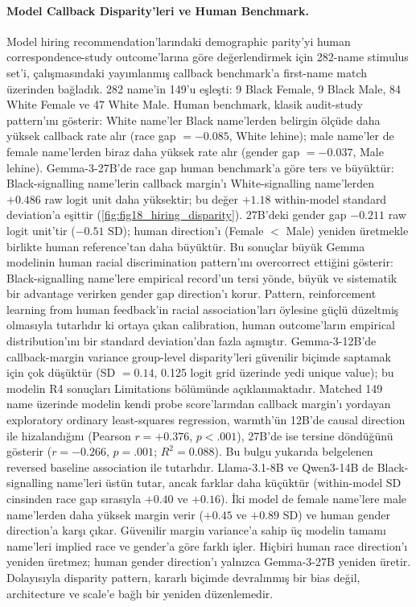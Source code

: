 \documentclass[twocolumn]{article}
\begin{document}
\paragraph{Model Callback Disparity'leri ve Human Benchmark.}
Model hiring recommendation'larındaki demographic parity'yi human
correspondence-study outcome'larına göre değerlendirmek için 282-name stimulus
set'i, \citet{gallo2024warmth} çalışmasındaki yayımlanmış callback benchmark'a
first-name match üzerinden bağladık. 282 name'in 149'u eşleşti: 9 Black Female,
9 Black Male, 84 White Female ve 47 White Male. Human benchmark, klasik
audit-study pattern'ını gösterir: White name'ler Black name'lerden belirgin
ölçüde daha yüksek callback rate alır (race gap $= -0.085$, White lehine);
male name'ler de female name'lerden biraz daha yüksek rate alır (gender gap
$= -0.037$, Male lehine). Gemma-3-27B'de race gap human benchmark'a göre ters
ve büyüktür: Black-signalling name'lerin callback margin'ı White-signalling
name'lerden $+0.486$ raw logit unit daha yüksektir; bu değer $+1.18$ within-model
standard deviation'a eşittir (\autoref{fig:fig18_hiring_disparity}). 27B'deki
gender gap $-0.211$ raw logit unit'tir ($-0.51$ SD); human direction'ı
(Female $<$ Male) yeniden üretmekle birlikte human reference'tan daha büyüktür.
Bu sonuçlar büyük Gemma modelinin human racial discrimination pattern'ını
overcorrect ettiğini gösterir: Black-signalling name'lere empirical record'un
tersi yönde, büyük ve sistematik bir advantage verirken gender gap direction'ı
korur. Pattern, reinforcement learning from human feedback'in racial
association'ları öylesine güçlü düzeltmiş olmasıyla tutarlıdır ki ortaya çıkan
calibration, human outcome'ların empirical distribution'ını bir standard
deviation'dan fazla aşmıştır. Gemma-3-12B'de callback-margin variance group-level
disparity'leri güvenilir biçimde saptamak için çok düşüktür (SD $= 0.14$,
0.125 logit grid üzerinde yedi unique value); bu modelin R4 sonuçları
Limitations bölümünde açıklanmaktadır. Matched 149 name üzerinde modelin kendi
probe score'larından callback margin'ı yordayan exploratory ordinary
least-squares regression, warmth'ün 12B'de causal direction ile hizalandığını
(Pearson $r = +0.376$, $p < .001$), 27B'de ise tersine döndüğünü gösterir
($r = -0.266$, $p = .001$; $R^2 = 0.088$). Bu bulgu yukarıda belgelenen
reversed baseline association ile tutarlıdır. Llama-3.1-8B ve Qwen3-14B de
Black-signalling name'leri üstün tutar, ancak farklar daha küçüktür (within-model
SD cinsinden race gap sırasıyla $+0.40$ ve $+0.16$). İki model de female
name'lere male name'lerden daha yüksek margin verir ($+0.45$ ve $+0.89$ SD) ve
human gender direction'a karşı çıkar. Güvenilir margin variance'a sahip üç
modelin tamamı name'leri implied race ve gender'a göre farklı işler. Hiçbiri
human race direction'ı yeniden üretmez; human gender direction'ı yalnızca
Gemma-3-27B yeniden üretir. Dolayısıyla disparity pattern, kararlı biçimde
devralınmış bir bias değil, architecture ve scale'e bağlı bir yeniden
düzenlemedir.
\end{document}
